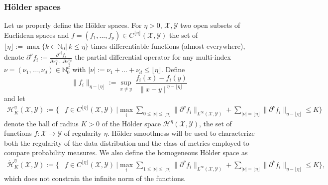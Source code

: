 \documentclass[10pt]{article}
\begin{document}
\subsubsection{Hölder spaces}
Let us properly define the Hölder spaces. For $\eta >0$, $\mathcal{X},\mathcal{Y}$ two open subsets of Euclidean spaces and $f=(f_1,...,f_p)\in C^{\lfloor \eta \rfloor}(\mathcal{X},\mathcal{Y})$ the set of $\lfloor \eta \rfloor:=\max \{k\in \mathbb{N}_0 |\ k\leq \eta\}$  times differentiable functions (almost everywhere), denote $\partial^\nu f_i := \frac{\partial^{|\nu|}f_i}{\partial x_1^{\nu_1}...\partial x_d^{\nu_d}}$ the partial differential operator  for any multi-index $\nu = (\nu_1,...,\nu_d)\in \mathbb{N}_0^d$ with $|\nu|:=\nu_1+...+\nu_d\leq \lfloor \eta \rfloor$. Define
$$
\|f_i\|_{\eta-\lfloor \eta \rfloor}:=\sup \limits_{x\neq y}\ \frac{f_i(x)-f_i(y)}{\|x-y\|^{\eta - \lfloor \eta \rfloor}} 
$$
and let 
\begin{align*}
\mathcal{H}^{\eta}_K(\mathcal{X},\mathcal{Y}):=\Big\{& f  \in C^{\lfloor \eta \rfloor}(\mathcal{X},\mathcal{Y}) \ \big| \max \limits_{i} \sum \limits_{0\leq |\nu|\leq \lfloor \eta \rfloor} \|\partial^\nu f_i\|_{L^\infty(\mathcal{X},\mathcal{Y})} + \sum \limits_{|\nu|  = \lfloor \eta \rfloor} \|\partial^\nu f_i\|_{\eta-\lfloor \eta \rfloor}   \leq K\Big\}
\end{align*}
denote the ball of radius $K>0$ of the Hölder space $\mathcal{H}^{\eta}(\mathcal{X},\mathcal{Y})$, the set of functions $f:\mathcal{X}\rightarrow \mathcal{Y}$ of regularity $\eta$. Hölder smoothness will be used to characterize both the regularity of the data distribution and the class of metrics employed to compare probability measures. We also define the homogeneous Hölder space as
\begin{align*}
\dot{\mathcal{H}}^{\eta}_K(\mathcal{X},\mathcal{Y}):=\Big\{& f  \in C^{\lfloor \eta \rfloor}(\mathcal{X},\mathcal{Y}) \ \big| \max \limits_{i} \sum \limits_{1\leq |\nu|\leq \lfloor \eta \rfloor} \|\partial^\nu f_i\|_{L^\infty(\mathcal{X},\mathcal{Y})} + \sum \limits_{|\nu|  = \lfloor \eta \rfloor} \|\partial^\nu f_i\|_{\eta-\lfloor \eta \rfloor}   \leq K\Big\},
\end{align*}
which does not constrain the infinite norm of the functions.
\end{document}
